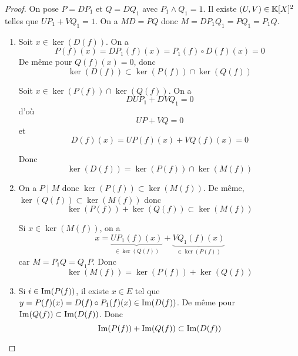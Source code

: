 \documentclass[12pt]{article}
\begin{document}
\begin{proof}
	On pose $P=DP_{1}$ et $Q=DQ_{1}$ avec $P_{1}\wedge Q_{1}=1$. Il existe $(U,V)\in\mathbb{K}[X]^{2}$ telles que $UP_{1}+VQ_{1}=1$. On a $MD=PQ$ donc $M=DP_{1}Q_{1}=PQ_{1}=P_{1}Q$.

	\begin{enumerate}
		\item Soit $x\in\ker(D(f))$. On a 
		\begin{equation}
			P(f)(x)=DP_{1}(f)(x)=P_{1}(f)\circ D(f)(x)=0	
		\end{equation}
		De même pour $Q(f)(x)=0$, donc 
		\begin{equation}
			\ker(D(f))\subset\ker(P(f))\cap\ker(Q(f))
		\end{equation}

		Soit $x\in\ker(P(f))\cap\ker(Q(f))$. On a
		\begin{equation}
			DUP_{1}+DVQ_{1}=0
		\end{equation}
		d'où 
		\begin{equation}
			UP+VQ=0
		\end{equation}
		et
		\begin{equation}
			D(f)(x)=UP(f)(x)+VQ(f)(x)=0
		\end{equation}

		Donc 
		\begin{equation}
			\boxed{\ker(D(f))=\ker(P(f))\cap\ker(M(f))}	
		\end{equation}

		\item On a $P\mid M$ donc $\ker(P(f))\subset\ker(M(f))$. De même, $\ker(Q(f))\subset\ker(M(f))$ donc 
		\begin{equation}
			\ker(P(f))+\ker(Q(f))\subset\ker(M(f))
		\end{equation}

		Si $x\in\ker(M(f))$, on a 
		\begin{equation}
			x=\underbrace{UP_{1}(f)(x)}_{\in\ker(Q(f))}+\underbrace{VQ_{1}(f)(x)}_{\in\ker(P(f))}
		\end{equation}
		car $M=P_{1}Q=Q_{1}P$. Donc 
		\begin{equation}
			\boxed{\ker(M(f))=\ker(P(f))+\ker(Q(f))}
		\end{equation}

		\item Si $i\in\mathrm{Im}(P(f))$, il existe $x\in E$ tel que $y=P(f)(x)=D(f)\circ P_{1}(f)(x)\in\mathrm{Im}(D(f))$. De même pour $\mathrm{Im}(Q(f))\subset\mathrm{Im}(D(f))$. Donc 
		\begin{equation}
			\mathrm{Im}(P(f))+\mathrm{Im}(Q(f))\subset\mathrm{Im}(D(f))
		\end{equation}


\end{enumerate}
\end{proof}
\end{document}
